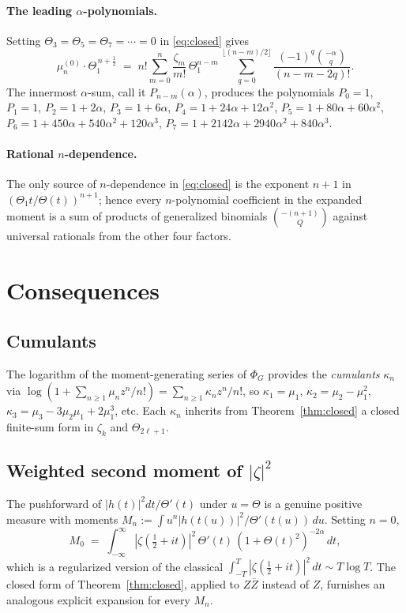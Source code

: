 \documentclass[11pt]{amsart}
\theoremstyle{definition}
\begin{document}
\paragraph{The leading $\alpha$-polynomials.}
Setting $\Theta_3=\Theta_5=\Theta_7=\cdots=0$ in \eqref{eq:closed} gives
\[
   \mu_{n}^{(0)}\cdot\Theta_{1}^{\,n+\tfrac12}
   \;=\; n!\sum_{m=0}^{n}\frac{\zeta_{m}}{m!}\,\Theta_{1}^{n-m}\,
        \sum_{q=0}^{\lfloor (n-m)/2\rfloor}
        \frac{(-1)^{q}\binom{-\alpha}{q}}{(n-m-2q)!}.
\]
The innermost $\alpha$-sum, call it $P_{n-m}(\alpha)$, produces the polynomials
$P_0=1$, $P_1=1$, $P_2=1+2\alpha$, $P_3=1+6\alpha$, $P_4=1+24\alpha+12\alpha^2$,
$P_5=1+80\alpha+60\alpha^2$, $P_6=1+450\alpha+540\alpha^2+120\alpha^3$,
$P_7=1+2142\alpha+2940\alpha^2+840\alpha^3$.

\paragraph{Rational $n$-dependence.}
The only source of $n$-dependence in \eqref{eq:closed} is the exponent $n+1$ in
$(\Theta_1 t/\Theta(t))^{n+1}$; hence every $n$-polynomial coefficient in the
expanded moment is a sum of products of generalized binomials $\binom{-(n+1)}{Q}$
against universal rationals from the other four factors.

\section{Consequences}

\subsection{Cumulants}\label{sec:cumulants}
The logarithm of the moment-generating series of $\Phi_G$ provides the
\emph{cumulants} $\kappa_n$ via
$\log(1+\sum_{n\ge 1}\mu_n z^n/n!) = \sum_{n\ge 1}\kappa_n z^n/n!$,
so $\kappa_1=\mu_1$, $\kappa_2=\mu_2-\mu_1^2$, $\kappa_3=\mu_3-3\mu_2\mu_1+2\mu_1^3$, etc.
Each $\kappa_n$ inherits from Theorem~\ref{thm:closed} a closed finite-sum form in
$\zeta_k$ and $\Theta_{2\ell+1}$.

\subsection{Weighted second moment of $|\zeta|^2$}\label{sec:weighted2}
The pushforward of $|h(t)|^2 dt/\Theta'(t)$ under $u=\Theta$ is a genuine
positive measure with moments $M_n:=\int u^n|h(t(u))|^2/\Theta'(t(u))\,du$.
Setting $n=0$,
\[
   M_0\;=\;\int_{-\infty}^{\infty} |\zeta(\tfrac12+it)|^{2}\,\Theta'(t)\,
                     (1+\Theta(t)^{2})^{-2\alpha}\,dt,
\]
which is a regularized version of the classical
$\int_{-T}^{T}|\zeta(\tfrac12+it)|^{2}\,dt \sim T\log T$.
The closed form of Theorem~\ref{thm:closed}, applied to $Z\overline{Z}$ instead of
$Z$, furnishes an analogous explicit expansion for every $M_n$.
\end{document}
